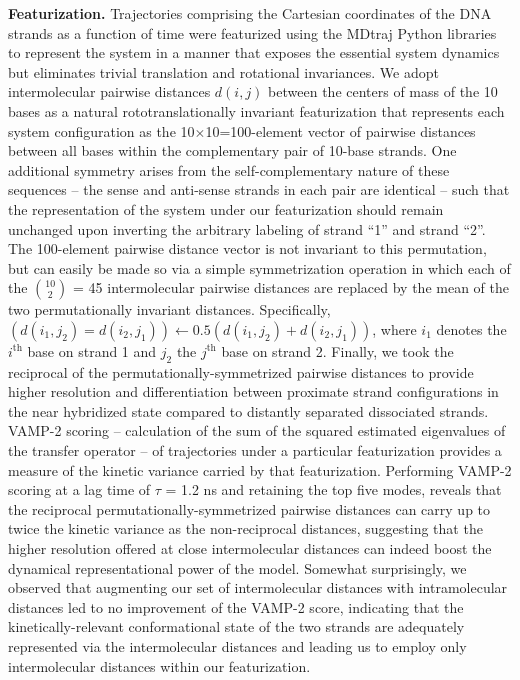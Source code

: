 \documentclass[journal=jpcbfk,manuscript=article]{achemso}
\begin{document}
\textbf{Featurization.} Trajectories comprising the Cartesian coordinates of the DNA strands as a function of time were featurized using the MDtraj Python libraries \citep{McGibbon2015MDTraj:Trajectories} to represent the system in a manner that exposes the essential system dynamics but eliminates trivial translation and rotational invariances. We adopt intermolecular pairwise distances $d(i,j)$ between the centers of mass of the 10 bases as a natural rototranslationally invariant featurization that represents each system configuration as the 10$\times$10=100-element vector of pairwise distances between all bases within the complementary pair of 10-base strands. One additional symmetry arises from the self-complementary nature of these sequences -- the sense and anti-sense strands in each pair are identical -- such that the representation of the system under our featurization should remain unchanged upon inverting the arbitrary labeling of strand ``1'' and strand ``2''.\citep{Sengupta2019AutomatedSelf-assembly} The 100-element pairwise distance vector is not invariant to this permutation, but can easily be made so via a simple symmetrization operation in which each of the $10 \choose 2$ =  45 intermolecular pairwise distances are replaced by the mean of the two permutationally invariant distances. Specifically, $\left( d(i_1,j_2) = d(i_2,j_1) \right) \leftarrow 0.5\left( d(i_1,j_2) + d(i_2,j_1) \right)$, where $i_1$ denotes the $i^\mathrm{th}$ base on strand 1 and $j_2$ the $j^\mathrm{th}$ base on strand 2. \citep{Sengupta2019AutomatedSelf-assembly} Finally, we took the reciprocal of the permutationally-symmetrized pairwise distances to provide higher resolution and differentiation between proximate strand configurations in the near hybridized state compared to distantly separated dissociated strands. VAMP-2 scoring -- calculation of the sum of the squared estimated eigenvalues of the transfer operator -- of trajectories under a particular featurization provides a measure of the kinetic variance carried by that featurization. \citep{Noe2013ASystems, Noe2015KineticSimulation, Scherer2019VariationalKinetics, Wu2020VariationalData} Performing VAMP-2 scoring at a lag time of $\tau$ = 1.2 ns and retaining the top five modes, reveals that the reciprocal permutationally-symmetrized pairwise distances can carry up to twice the kinetic variance as the non-reciprocal distances, suggesting that the higher resolution offered at close intermolecular distances can indeed boost the dynamical representational power of the model. Somewhat surprisingly, we observed that augmenting our set of intermolecular distances with intramolecular distances led to no improvement of the VAMP-2 score, indicating that the kinetically-relevant conformational state of the two strands are adequately represented via the intermolecular distances and leading us to employ only intermolecular distances within our featurization.
\end{document}
